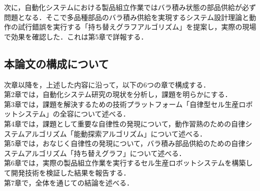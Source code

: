 次に，自動化システムにおける製品組立作業ではバラ積み状態の部品供給が必ず問題となる．そこで多品種部品のバラ積み供給を実現するシステム設計理論と動作の試行錯誤を実行する「持ち替えグラフアルゴリズム」を提案し，実際の現場で効果を確認した．これは第5章で詳報する．\newpage



\subsection{本論文の構成について}
\noindent
次章以降を，上述した内容に沿って，以下の6つの章で構成する．\\

\noindent
第2章では，自動化システム研究の現状を分析し，課題を明らかにする．\\

\noindent
第3章では，課題を解決するための技術プラットフォーム「自律型セル生産ロボットシステム」の全容について述べる．\\

\noindent
第4章では，課題として重要な自律性の発現について，動作習熟のための自律システムアルゴリズム「能動探索アルゴリズム」について述べる．\\

\noindent
第5章では，おなじく自律性の発現について，バラ積み部品供給のための自律システムアルゴリズム「持ち替えグラフ」について述べる．\\

\noindent
第6章では，実際の製品組立作業を実行するセル生産ロボットシステムを構築して開発技術を検証した結果を報告する．\\

\noindent
第7章で，全体を通じての結論を述べる．\\



\endinput
